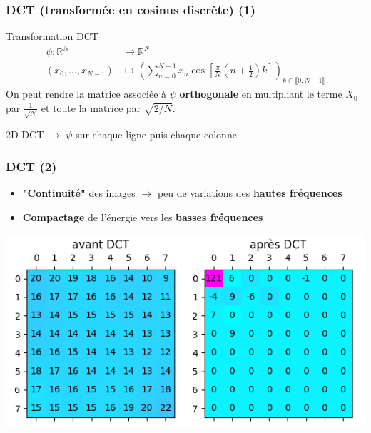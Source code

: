 \documentclass[aspectratio=43]{beamer}
\begin{document}
\begin{frame}
    \frametitle{DCT (transformée en cosinus discrète) (1)}
    \centering
    \begin{block}{Transformation DCT}
        \begin{align*}
            \psi \colon \mathbb{R}^N & \rightarrow \mathbb{R}^N\\
            (x_0, \dots, x_{N-1}) & \longmapsto
            \left( \sum_{n=0}^{N - 1} x_n \cos \left[ \frac{\pi}{N}(n + \frac{1}{2})k \right] \right)_{k \in \llbracket 0, N - 1 \rrbracket}
        \end{align*}
        On peut rendre la matrice associée à $\psi$ \textbf{orthogonale} en multipliant le terme $X_0$ par $\frac{1}{\sqrt{N}}$ et toute la matrice par $\sqrt{2/N}$.
    \end{block}
    2D-DCT $\rightarrow$ $\psi$ sur chaque ligne puis chaque colonne
\end{frame}

\begin{frame}
    \frametitle{DCT (2)}

    \begin{itemize}
        \item \textbf{"Continuité"} des images $\rightarrow$ peu de variations des \textbf{hautes fréquences}
        \item \textbf{Compactage} de l'énergie vers les \textbf{basses fréquences}
    \end{itemize}

    \centering
    \includegraphics[width=\textwidth]{img/energyCompaction.png}

\end{frame}
\end{document}
